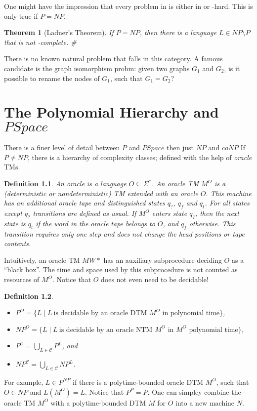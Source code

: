 \documentclass{report}
\newcommand{\NP}{\text{$\mathit{NP}$}}
\newcommand{\Po}{\text{$\mathit{P}$}}
\newtheorem{definition}{Definition}[chapter]
\newtheorem{theorem}[definition]{Theorem}
\begin{document}
One might have the impression that every problem in \NP is either in \Po or \NP-hard. This is only true if $\Po=\NP$.

\begin{theorem}[Ladner's Theorem]If $\Po=\NP$, then there is a language $L\in\NP\setminus\Po$ that is not \NP-complete. \#
\end{theorem}
There is no known natural problem that falls in this category. A famous candidate is the graph isomorphism probm: given two graphs $G_1$ and $G_2$, is it possible to rename the nodes of $G_1$, such that $G_1=G_2$?


\chapter{The Polynomial Hierarchy and $PSpace$}

There is a finer level of detail between $\Po$ and $PSpace$ then just $\NP$ and $co\NP$ If $\Po \neq \NP$, there is a hierarchy of complexity classes; defined with the help of \emph{oracle} TMs. 

\begin{definition} An \emph{oracle} is a language $O \subseteq \Sigma^*$. An \emph{oracle TM $M^O$} is a (deterministic or nondeterministic) TM extended with an oracle $O$. This machine has an additional \emph{oracle tape} and distinguished states $q_?$, $q_f$ and $q_t$. For all states except $q_?$ transitions are defined as usual. If $M^O$ enters state $q_?$, then the next state is $q_t$ if the word in the oracle tape belongs to $O$, and $q_f$ otherwise. This transition requires only one step and does not change the head positions or tape contents. 
\end{definition}
Intuitively, an oracle TM $MW*$ has an auxiliary subprocedure deciding $O$ as a ``black box''. The time and space used by this subprocedure is not counted as resources of $M^O$. Notice that $O$ does not even need to be decidable!

\begin{definition} \mbox{}
\begin{itemize}
 \item $\Po^O = \{ L \mid L~\text{is decidable by an oracle DTM $M^O$ in polynomial time}\}$,
 \item $\NP^O = \{ L \mid L~\text{is decidable by an oracle NTM $M^O$ in $M^O$ polynomial time}\}$,
 \item $\Po^{\mathcal{C}} = \bigcup_{L \in \mathcal{C}} \Po^L$, and 
 \item $\NP^{\mathcal{C}} = \bigcup_{L \in \mathcal{C}} \NP^L$. 
\end{itemize}
\end{definition}
For example, $L \in \Po^\NP$ if there is a polytime-bounded oracle DTM $M^O$, such that $O \in \NP$ and $L(M^O) = L$. Notice that $\Po^\Po = P$. One can simpley combine the oracle TM $M^O$ with a polytime-bounded DTM $M$ for $O$ into a new machine $N$. 
\end{document}
